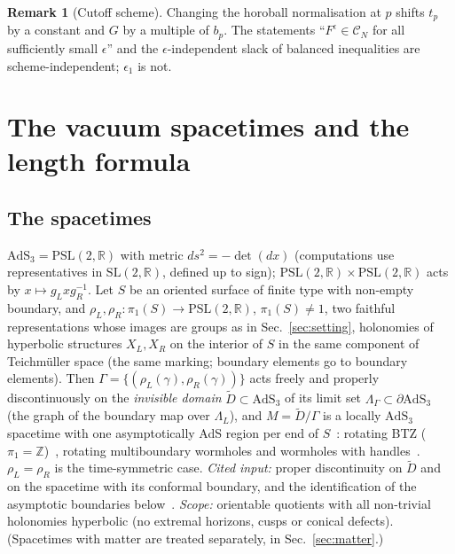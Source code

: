 \documentclass[aps,prd,onecolumn,superscriptaddress,nofootinbib,amsmath,amssymb,11pt]{revtex4-2}
\theoremstyle{definition}
\newtheorem{remark}[theorem]{Remark}
\newcommand{\AdS}{\mathrm{AdS}_3}
\newcommand{\R}{\mathbb{R}}
\newcommand{\Z}{\mathbb{Z}}
\newcommand{\PSL}{\mathrm{PSL}(2,\R)}
\newcommand{\SL}{\mathrm{SL}(2,\R)}
\newcommand{\CN}{\mathcal{C}_N}
\newcommand{\eps}{\epsilon}
\newcommand{\Dt}{\tilde D}
\begin{document}
\begin{remark}[Cutoff scheme]
Changing the horoball normalisation at $p$ shifts $t_p$ by a constant and $G$ by a multiple of $b_p$. The statements
``$F^\eps\in\CN$ for all sufficiently small $\eps$'' and the $\eps$-independent slack of balanced inequalities are
scheme-independent; $\eps_1$ is not.
\end{remark}

\section{The vacuum spacetimes and the length formula}\label{sec:spacetimes}

\subsection{The spacetimes}

$\AdS=\PSL$ with metric $ds^2=-\det(dx)$ (computations use representatives in $\SL$, defined up to sign);
$\PSL\times\PSL$ acts by $x\mapsto g_Lxg_R^{-1}$. Let $S$ be an oriented surface of finite type with non-empty
boundary, and $\rho_L,\rho_R:\pi_1(S)\to\PSL$, $\pi_1(S)\ne1$, two faithful representations whose images are groups as in
Sec.~\ref{sec:setting}, holonomies of hyperbolic structures $X_L,X_R$ on the interior of $S$ in the same component of
Teichm\"uller space (the same marking; boundary elements go to boundary elements). Then
$\Gamma=\{(\rho_L(\gamma),\rho_R(\gamma))\}$ acts freely and properly discontinuously on the \emph{invisible domain}
$\Dt\subset\AdS$ of its limit set $\Lambda_\Gamma\subset\partial\AdS$ (the graph of the boundary map over $\Lambda_L$),
and $M=\Dt/\Gamma$ is a locally $\AdS$ spacetime with one asymptotically AdS region per end of
$S$~\cite{Mess2007,Barbot2008,BKS2011,BonsanteSeppi2020}: rotating BTZ ($\pi_1=\Z$)~\cite{BTZ1992}, rotating
multiboundary wormholes and wormholes with handles~\cite{ABHP1996,ABH1999,Krasnov2000,SkenderisVanRees2011}.
$\rho_L=\rho_R$ is the time-symmetric case. \emph{Cited input:} proper discontinuity on $\Dt$ and on the spacetime with
its conformal boundary, and the identification of the asymptotic boundaries below~\cite{Mess2007,Barbot2008,BKS2011}.
\emph{Scope:} orientable quotients with all non-trivial holonomies hyperbolic (no extremal horizons, cusps or conical
defects).
(Spacetimes with matter are treated separately, in Sec.~\ref{sec:matter}.)
\end{document}
